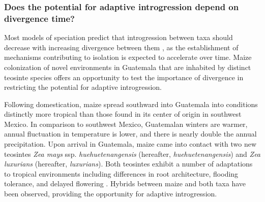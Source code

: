 \subsubsection{Does the potential for adaptive introgression depend on divergence time?}
\label{sss:adaptive_intro}
Most models of speciation predict that introgression between taxa should decrease with increasing divergence between them \citep{harrison2014hybridization}, as the establishment of mechanisms contributing to isolation \citep[e.g. postzyogtic isolation; ][]{orr2001evolution} is expected to accelerate over time. Maize colonization of novel environments in Guatemala that are inhabited by distinct teosinte species offers an opportunity to test the importance of divergence in restricting the potential for adaptive introgression.

Following domestication, maize spread southward into Guatemala into conditions distinctly more tropical than those found in its center of origin in southwest Mexico.
In comparison to southwest Mexico, Guatemalan winters are warmer, annual fluctuation in temperature is lower, and there is nearly double the annual precipitation.
Upon arrival in Guatemala, maize came into contact with two new teosintes \emph{Zea mays} ssp. \emph{huehuetenangensis} (hereafter, \emph{huehuetenangensis}) and \emph{Zea luxurians} (hereafter, \emph{luxurians}). 
Both teosintes exhibit a number of adaptations to tropical environments including differences in root architecture, flooding tolerance, and delayed flowering \citep{wilkes1967teosinte, mano2006}.
Hybrids between maize and both taxa \citep{wilkes1967teosinte} have been observed, providing the opportunity for adaptive introgression.  

